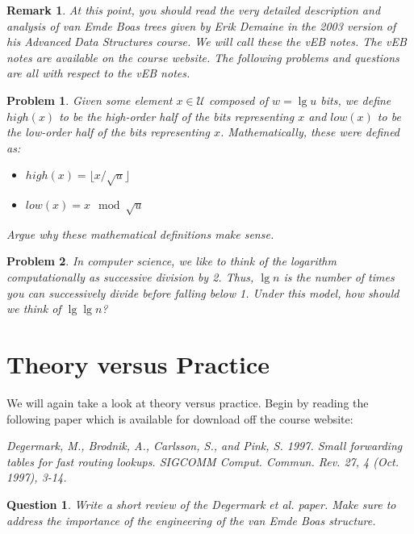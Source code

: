 \documentclass[11pt]{article}
\newtheorem{question}{Question}
\newtheorem{problem}{Problem}
\newtheorem{remark}{Remark}
\begin{document}
\begin{remark}
At this point, you should read the very detailed description and analysis of van Emde Boas trees given by Erik Demaine in the 2003 version of his Advanced Data Structures course.  We will call these the {\em vEB notes}.  The vEB notes are available on the course website.  The following problems and questions are all with respect to the vEB notes.
\end{remark}

\begin{problem}
Given some element $x \in \mathcal{U}$ composed of $w=\lg u$ bits, we define $high(x)$ to be the high-order half of the bits representing $x$ and $low(x)$ to be the low-order half of the bits representing $x$.  Mathematically, these were defined as:
\begin{itemize}
	\item $high(x) = \lfloor x / \sqrt{u} \rfloor$
	\item $low(x) = x \mod \sqrt{u}$
\end{itemize}
Argue why these mathematical definitions make sense.
\end{problem}

\begin{problem}
In computer science, we like to think of the logarithm computationally as successive division by 2.  Thus, $\lg n$ is the number of times you can successively divide before falling below 1.  Under this model, how should we think of $\lg \lg n$?
\end{problem}

\section{Theory versus Practice}

We will again take a look at theory versus practice.  Begin by reading the following paper which is available for download off the course website:

{\em Degermark, M., Brodnik, A., Carlsson, S., and Pink, S. 1997. Small forwarding tables for fast routing lookups. 
SIGCOMM Comput. Commun. Rev. 27, 4 (Oct. 1997), 3-14.}

\begin{question}
Write a short review of the {\em Degermark et al.} paper.  Make sure to address the importance of the engineering of the van Emde Boas structure.
\end{question}
\end{document}
